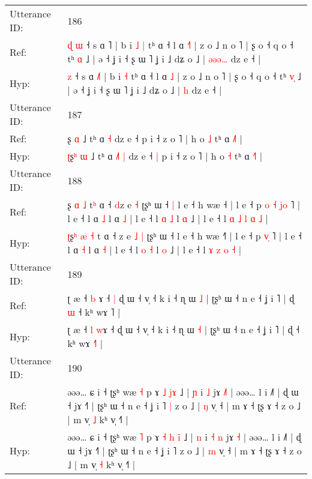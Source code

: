 \documentclass[10pt]{article}
\DeclareRobustCommand{\hl}[1]{{\textcolor{red}{#1}}}
\begin{document}
\begin{longtable}{ll}
 \\
\midrule
Utterance ID: & 186 \\
Ref: & \hl{ɖ}\hl{ }\hl{ɯ} ˧ s ɑ \hl{}˥ | b i\hl{ }\hl{˩} \hl{|} tʰ ɑ ˧ l ɑ \hl{˧}\hl{˥} | z o ˩ n o ˥ | ʂ o ˧ q o ˧ tʰ \hl{}\hl{ɑ} ˩ | ə ˧ ʝ i ˧ ʂ ɯ ˥ ʝ i ˩ dʑ o ˩ | \hl{ə}\hl{ə}\hl{ə}\hl{…} dz e ˧ |
 \\
Hyp: & \hl{}\hl{}\hl{z} ˧ s ɑ \hl{˩}˥ | b i\hl{}\hl{} \hl{˧} tʰ ɑ ˧ l ɑ \hl{}\hl{˩} | z o ˩ n o ˥ | ʂ o ˧ q o ˧ tʰ \hl{v}\hl{̩} ˩ | ə ˧ ʝ i ˧ ʂ ɯ ˥ ʝ i ˩ dʑ o ˩ | \hl{}\hl{}\hl{}\hl{h} dz e ˧ |
 \\
\midrule
Utterance ID: & 187 \\
Ref: & \hl{}ʂ\hl{} \hl{ɑ} ˩ tʰ ɑ\hl{}\hl{}\hl{} \hl{˧} dz e ˧\hl{}\hl{} p i ˧ z o ˥ | h o \hl{˩} tʰ ɑ \hl{˩}˥ |
 \\
Hyp: & \hl{ʈ}ʂ\hl{ʰ} \hl{ɯ} ˩ tʰ ɑ\hl{ }\hl{˩}\hl{˥} \hl{|} dz e ˧\hl{ }\hl{|} p i ˧ z o ˥ | h o \hl{˧} tʰ ɑ \hl{˧}˥ |
 \\
\midrule
Utterance ID: & 188 \\
Ref: & \hl{}ʂ\hl{} \hl{ɑ} \hl{˩} t\hl{ʰ} ɑ ˧ \hl{d}z e\hl{}\hl{} \hl{˧} ʈʂʰ ɯ ˧\hl{ }\hl{|} l e ˧ h wæ ˧\hl{} | l e ˧ p\hl{ }\hl{o}\hl{ }\hl{˧} \hl{j}\hl{o} ˥ | l e ˧ l ɑ \hl{˩} l ɑ \hl{˩} | l e ˧ l \hl{ɑ} \hl{˩} l \hl{ɑ} ˩ | l e ˧ l\hl{ }\hl{ɑ} \hl{˩} \hl{l} \hl{ɑ} \hl{˩} |
 \\
Hyp: & \hl{ʈ}ʂ\hl{ʰ} \hl{æ} \hl{˧} t\hl{} ɑ ˧ \hl{}z e\hl{ }\hl{˩} \hl{|} ʈʂʰ ɯ ˧\hl{}\hl{} l e ˧ h wæ ˧\hl{˥} | l e ˧ p\hl{}\hl{}\hl{}\hl{} \hl{v}\hl{̩} ˥ | l e ˧ l ɑ \hl{˧} l ɑ \hl{˧} | l e ˧ l \hl{o} \hl{˧} l \hl{o} ˩ | l e ˧ l\hl{}\hl{} \hl{ɤ} \hl{z} \hl{o} \hl{˧} |
 \\
\midrule
Utterance ID: & 189 \\
Ref: & ʈ æ ˧ \hl{b} \hl{}ɤ ˧\hl{ }\hl{|} ɖ ɯ ˧ v̩ ˧ k i ˧ ɳ ɯ \hl{˩} | ʈʂʰ ɯ ˧ n e ˧ ʝ i ˥ | ɖ\hl{ }\hl{ɯ} ˧ kʰ wɤ \hl{}˥ |
 \\
Hyp: & ʈ æ ˧ \hl{l} \hl{w}ɤ ˧\hl{}\hl{} ɖ ɯ ˧ v̩ ˧ k i ˧ ɳ ɯ \hl{˧} | ʈʂʰ ɯ ˧ n e ˧ ʝ i ˥ | ɖ\hl{}\hl{} ˧ kʰ wɤ \hl{˧}˥ |
 \\
\midrule
Utterance ID: & 190 \\
Ref: & əəə… ɕ i ˧ ʈʂʰ wæ \hl{˧} p ɤ\hl{}\hl{} \hl{˩} \hl{j}\hl{ɤ} ˩ | \hl{ɲ} i\hl{}\hl{} \hl{˩} jɤ \hl{˩}\hl{˥} | əəə… l i ˩˥ | ɖ ɯ ˧ jɤ ˧˥ | ʈʂʰ ɯ ˧ n e ˧ ʝ i ˥\hl{ }\hl{|} z o ˩ | \hl{ŋ} v̩ ˧ | m ɤ ˧ ʈʂ ɤ ˧ z o ˩ | m v̩ \hl{˩} kʰ v̩ ˧˥ |
 \\
Hyp: & əəə… ɕ i ˧ ʈʂʰ wæ \hl{˥} p ɤ\hl{ }\hl{˧} \hl{h} \hl{i}\hl{̃} ˩ | \hl{n} i\hl{ }\hl{˧} \hl{n} jɤ \hl{}\hl{˧} | əəə… l i ˩˥ | ɖ ɯ ˧ jɤ ˧˥ | ʈʂʰ ɯ ˧ n e ˧ ʝ i ˥\hl{}\hl{} z o ˩ | \hl{m} v̩ ˧ | m ɤ ˧ ʈʂ ɤ ˧ z o ˩ | m v̩ \hl{˧} kʰ v̩ ˧˥ |

\end{longtable}
\end{document}
